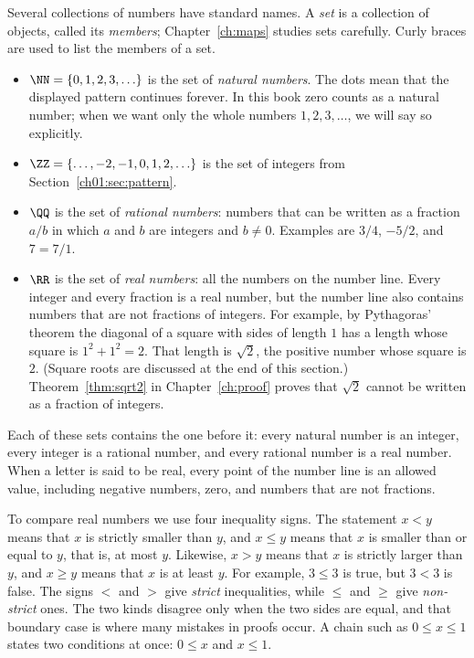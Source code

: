 Several collections of numbers have standard names. A \emph{set} is a collection of objects, called its \emph{members}; Chapter~\ref{ch:maps} studies sets carefully. Curly braces are used to list the members of a set.
\begin{itemize}
\item $\NN=\{0,1,2,3,\ldots\}$ is the set of \emph{natural numbers}. The dots mean that the displayed pattern continues forever. In this book zero counts as a natural number; when we want only the whole numbers $1,2,3,\ldots$, we will say so explicitly.
\item $\ZZ=\{\ldots,-2,-1,0,1,2,\ldots\}$ is the set of integers from Section~\ref{ch01:sec:pattern}.
\item $\QQ$ is the set of \emph{rational numbers}: numbers that can be written as a fraction $a/b$ in which $a$ and $b$ are integers and $b\ne0$. Examples are $3/4$, $-5/2$, and $7=7/1$.
\item $\RR$ is the set of \emph{real numbers}: all the numbers on the number line. Every integer and every fraction is a real number, but the number line also contains numbers that are not fractions of integers. For example, by Pythagoras' theorem the diagonal of a square with sides of length $1$ has a length whose square is $1^2+1^2=2$. That length is $\sqrt2$, the positive number whose square is $2$. (Square roots are discussed at the end of this section.) Theorem~\ref{thm:sqrt2} in Chapter~\ref{ch:proof} proves that $\sqrt2$ cannot be written as a fraction of integers.
\end{itemize}
Each of these sets contains the one before it: every natural number is an integer, every integer is a rational number, and every rational number is a real number. When a letter is said to be real, every point of the number line is an allowed value, including negative numbers, zero, and numbers that are not fractions.

To compare real numbers we use four inequality signs. The statement $x<y$ means that $x$ is strictly smaller than $y$, and $x\le y$ means that $x$ is smaller than or equal to $y$, that is, at most $y$. Likewise, $x>y$ means that $x$ is strictly larger than $y$, and $x\ge y$ means that $x$ is at least $y$. For example, $3\le3$ is true, but $3<3$ is false. The signs $<$ and $>$ give \emph{strict} inequalities, while $\le$ and $\ge$ give \emph{non-strict} ones. The two kinds disagree only when the two sides are equal, and that boundary case is where many mistakes in proofs occur. A chain such as $0\le x\le1$ states two conditions at once: $0\le x$ and $x\le1$.

